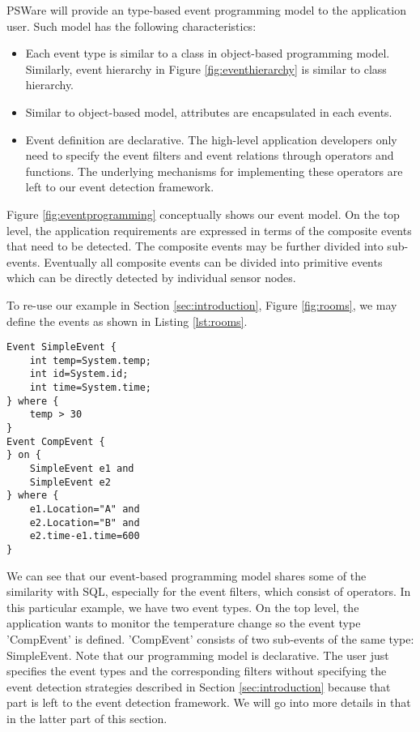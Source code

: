PSWare will provide an type-based event programming model to the application user. Such model has the following characteristics:
\begin{itemize}
\item Each event type is similar to a class in object-based programming model. Similarly, event hierarchy in Figure \ref{fig:eventhierarchy} is similar to class hierarchy.
\item Similar to object-based model, attributes are encapsulated in each events.
\item Event definition are declarative. The high-level application developers only need to specify the event filters and event relations through operators and functions. The underlying mechanisms for implementing these operators are left to our event detection framework.
\end{itemize}

Figure \ref{fig:eventprogramming} conceptually shows our event model. On the top level, the application requirements are expressed in terms of the composite events that need to be detected. The composite events may be further divided into sub-events. Eventually all composite events can be divided into primitive events which can be directly detected by individual sensor nodes.

To re-use our example in Section \ref{sec:introduction}, Figure \ref{fig:rooms}, we may define the events as shown in Listing \ref{lst:rooms}.
\begin{lstlisting}[caption=Example of using even-based programming model, label=lst:rooms]
Event SimpleEvent {
	int temp=System.temp;
	int id=System.id;
	int time=System.time;
} where {
	temp > 30
}
Event CompEvent {
} on {
	SimpleEvent e1 and
	SimpleEvent e2
} where {
	e1.Location="A" and
	e2.Location="B" and
	e2.time-e1.time=600
}
\end{lstlisting}

We can see that our event-based programming model shares some of the similarity with SQL, especially for the event filters, which consist of operators. In this particular example, we have two event types. On the top level, the application wants to monitor the temperature change so the event type 'CompEvent' is defined. 'CompEvent' consists of two sub-events of the same type: SimpleEvent. Note that our programming model is declarative. The user just specifies the event types and the corresponding filters without specifying the event detection strategies described in Section \ref{sec:introduction} because that part is left to the event detection framework. We will go into more details in that in the latter part of this section.

